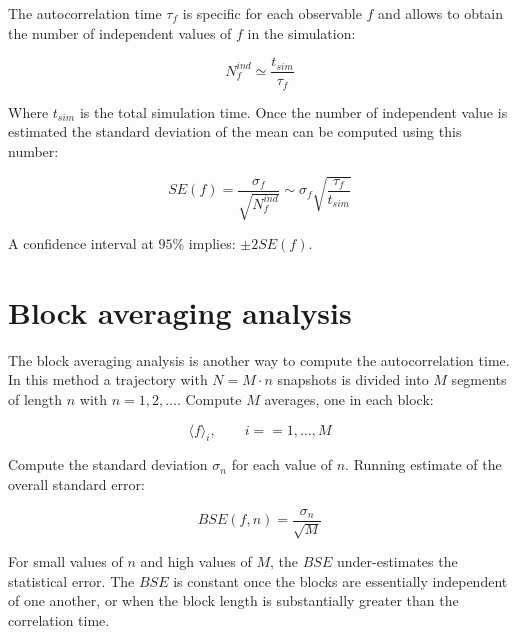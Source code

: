	The autocorrelation time $\tau_f$ is specific for each observable $f$ and allows to obtain the number of independent values of $f$ in the simulation:

	$$N_f^{ind}\simeq\frac{t_{sim}}{\tau_f}$$

	Where $t_{sim}$ is the total simulation time.
	Once the number of independent value is estimated the standard deviation of the mean can be computed using this number:

	$$SE(f) = \frac{\sigma_f}{\sqrt{N_f^{ind}}}\sim\sigma_f\sqrt{\frac{\tau_f}{t_{sim}}}$$

	A confidence interval at $95\%$ implies: $\pm 2 SE(f)$.

\section{Block averaging analysis}
The block averaging analysis is another way to compute the autocorrelation time.
In this method a trajectory with $N = M\cdot n$ snapshots is divided into $M$ segments of length $n$ with $n =1, 2, \dots$.
Compute $M$ averages, one in each block:

$$\langle f\rangle_i, \qquad i = =1, \dots, M$$

Compute the standard deviation $\sigma_n$ for each value of $n$.
Running estimate of the overall standard error:

$$BSE(f, n) = \frac{\sigma_n}{\sqrt{M}}$$

For small values of $n$ and high values of $M$, the $BSE$ under-estimates the statistical error.
The $BSE$ is constant once the blocks are essentially independent of one another, or when the block length is substantially greater than the correlation time.



